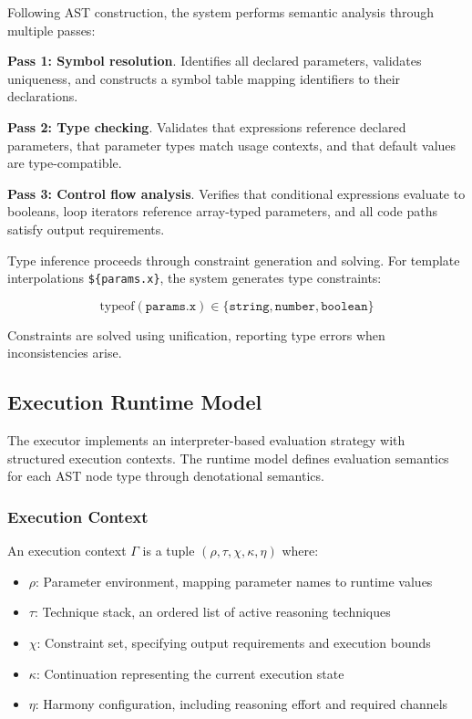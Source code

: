 \documentclass[11pt,a4paper]{article}
\begin{document}
Following AST construction, the system performs semantic analysis through multiple passes:

\textbf{Pass 1: Symbol resolution}. Identifies all declared parameters, validates uniqueness, and constructs a symbol table mapping identifiers to their declarations.

\textbf{Pass 2: Type checking}. Validates that expressions reference declared parameters, that parameter types match usage contexts, and that default values are type-compatible.

\textbf{Pass 3: Control flow analysis}. Verifies that conditional expressions evaluate to booleans, loop iterators reference array-typed parameters, and all code paths satisfy output requirements.

Type inference proceeds through constraint generation and solving. For template interpolations \texttt{\$\{params.x\}}, the system generates type constraints:

$$\text{typeof}(\texttt{params.x}) \in \{\texttt{string}, \texttt{number}, \texttt{boolean}\}$$

Constraints are solved using unification, reporting type errors when inconsistencies arise.

\subsection{Execution Runtime Model}

The executor implements an interpreter-based evaluation strategy with structured execution contexts. The runtime model defines evaluation semantics for each AST node type through denotational semantics.

\subsubsection{Execution Context}

An execution context $\Gamma$ is a tuple $(\rho, \tau, \chi, \kappa, \eta)$ where:

\begin{itemize}
\item $\rho$: Parameter environment, mapping parameter names to runtime values
\item $\tau$: Technique stack, an ordered list of active reasoning techniques
\item $\chi$: Constraint set, specifying output requirements and execution bounds
\item $\kappa$: Continuation representing the current execution state
\item $\eta$: Harmony configuration, including reasoning effort and required channels
\end{itemize}
\end{document}
